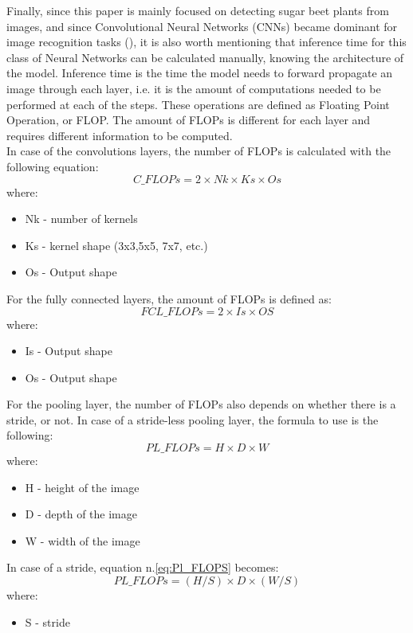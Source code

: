 Finally, since this paper is mainly focused on detecting sugar beet plants from images, and since Convolutional Neural Networks (CNNs) became dominant for image recognition tasks (\cite{articleCNN}), it is also worth mentioning that inference time for this class of Neural Networks can be calculated manually, knowing the architecture of the model. Inference time is the time the model needs to forward propagate an image through each layer, i.e. it is the amount of computations needed to be performed at each of the steps. These operations are defined as Floating Point Operation, or FLOP. The amount of FLOPs is different for each layer and requires different information to be computed. \\
In case of the convolutions layers, the number of FLOPs is calculated with the following equation:
\begin{equation}
C\_FLOPs = 2\times Nk \times Ks \times Os
\end{equation}
where:
\begin{itemize}
\item[] Nk - number of kernels
\item[] Ks - kernel shape (3x3,5x5, 7x7, etc.)
\item[] Os - Output shape
\end{itemize}
For the fully connected layers, the amount of FLOPs is defined as:
\begin{equation}
FCL\_FLOPs = 2\times Is \times OS
\end{equation}
where:
\begin{itemize}
\item[] Is - Output shape
\item[] Os - Output shape
\end{itemize}
For the pooling layer, the number of FLOPs also depends on whether there is a stride, or not. In case of a stride-less pooling layer, the formula to use is the following:
\begin{equation}
PL\_FLOPs = H \times D \times W
\label{eq:Pl_FLOPS}
\end{equation}
where:
\begin{itemize}
\item[] H - height of the image
\item[] D - depth of the image
\item[] W - width of the image
\end{itemize}
In case of a stride, equation n.\ref{eq:Pl_FLOPS} becomes:
\begin{equation}
PL\_FLOPs = (H/S) \times D \times (W/S)
\end{equation}
where:
\begin{itemize}
\item[] S - stride
\end{itemize}

